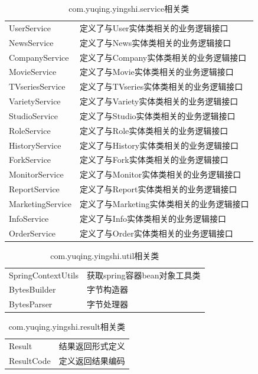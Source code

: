 \begin{table}
	\caption{com.yuqing.yingshi.service相关类}
	\centering
	\begin{tabular}{|p{3cm}|p{10cm}|} 
		\hline 
		\rowcolor[HTML]{DAE8FC} 
		\multicolumn{2}{|c|}{com.yuqing.yingshi.service相关类} \\ 
		\hline 
		UserService&定义了与User实体类相关的业务逻辑接口\\
		NewsService&定义了与News实体类相关的业务逻辑接口\\
		CompanyService&定义了与Company实体类相关的业务逻辑接口\\
		MovieService&定义了与Movie实体类相关的业务逻辑接口\\
		TVseriesService&定义了与TVseries实体类相关的业务逻辑接口\\
		VarietyService&定义了与Variety实体类相关的业务逻辑接口\\
		StudioService&定义了与Studio实体类相关的业务逻辑接口\\
		RoleService&定义了与Role实体类相关的业务逻辑接口\\
		HistoryService&定义了与History实体类相关的业务逻辑接口\\
		ForkService&定义了与Fork实体类相关的业务逻辑接口\\
		MonitorService&定义了与Monitor实体类相关的业务逻辑接口\\
		ReportService&定义了与Report实体类相关的业务逻辑接口\\
		MarketingService&定义了与Marketing实体类相关的业务逻辑接口\\
		InfoService&定义了与Info实体类相关的业务逻辑接口\\
		OrderService&定义了与Order实体类相关的业务逻辑接口\\
		\hline 
	\end{tabular}
\end{table}
\begin{table}
	\caption{com.yuqing.yingshi.util相关类}
	\centering
	\begin{tabular}{|p{4.5cm}|p{8.5cm}|} 
		\hline 
		\rowcolor[HTML]{DAE8FC} 
		\multicolumn{2}{|c|}{com.yuqing.yingshi.util相关类} \\ 
		\hline 
		SpringContextUtils&获取spring容器bean对象工具类\\
		BytesBuilder&字节构造器\\
		BytesParser&字节处理器\\
		\hline 
	\end{tabular}
\end{table}
\begin{table}
	\caption{com.yuqing.yingshi.result相关类}
	\centering
	\begin{tabular}{|p{4.5cm}|p{8.5cm}|} 
		\hline 
		\rowcolor[HTML]{DAE8FC} 
		\multicolumn{2}{|c|}{com.yuqing.yingshi.result相关类} \\ 
		\hline 
		Result&结果返回形式定义\\
		ResultCode&定义返回结果编码\\
		\hline 
	\end{tabular}
\end{table}
